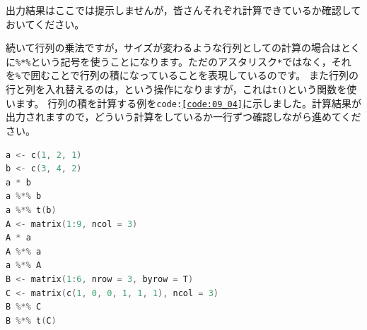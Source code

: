 \documentclass{ltjsbook}
\begin{document}
出力結果はここでは提示しませんが，皆さんそれぞれ計算できているか確認しておいてください。

続いて行列の乗法ですが，サイズが変わるような行列としての計算の場合はとくに\verb|%*%|という記号を使うことになります。ただのアスタリスク\verb|*|ではなく，それを\verb|%|で囲むことで行列の積になっていることを表現しているのです。
また行列の行と列を入れ替えるのは，という操作になりますが，これは\texttt{t()}という関数を使います。
行列の積を計算する例を\texttt{code:\ref{code:09_04}}に示しました。計算結果が出力されますので，どういう計算をしているか一行ずつ確認しながら進めてください。

\begin{lstlisting}[language=c++,label={code:09_04},caption={行列の積}]
a <- c(1, 2, 1)
b <- c(3, 4, 2)
a * b
a %*% b
a %*% t(b)
A <- matrix(1:9, ncol = 3)
A * a
A %*% a
a %*% A
B <- matrix(1:6, nrow = 3, byrow = T)
C <- matrix(c(1, 0, 0, 1, 1, 1), ncol = 3)
B %*% C
B %*% t(C)
\end{lstlisting}
\end{document}
